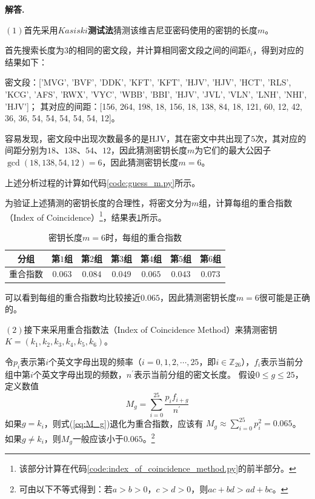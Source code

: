 \documentclass[12pt, a4paper, oneside]{ctexart}
\newenvironment{solution}{\par\noindent\textbf{解答. }}{\par}
\begin{document}
	\begin{solution}
		
		$ (1) $首先采用\textbf{$ Kasiski $测试法}猜测该维吉尼亚密码使用的密钥的长度$ m $。
		
		首先搜索长度为$ 3 $的相同的密文段，并计算相同密文段之间的间距$ \delta_{i} $，得到对应的结果如下：
		
		密文段：['MVG', 'BVF', 'DDK', 'KFT', 'KFT', 'HJV', 'HJV', 'HCT', 'RLS', 'KCG', 'AFS', 'RWX', 'VYC', 'WBB', 'BBI', 'HJV', 'JVL', 'VLN', 'LNH', 'NHI', 'HJV']；
		其对应的间距：[156, 264, 198, 18, 156, 18, 138, 84, 18, 121, 60, 12, 42, 36, 36, 54, 54, 54, 54, 54, 12]。
		
		容易发现，密文段中出现次数最多的是\textrm{HJV}，其在密文中共出现了$ 5 $次，其对应的间距分别为$ 18 $、$ 138 $、$ 54 $、$ 12 $，因此猜测密钥长度$ m $为它们的最大公因子$ \gcd{\left ( 18, 138, 54, 12 \right )} = 6 $，因此猜测密钥长度$ m = 6 $。
		
		上述分析过程的计算如代码\ref{code:guess_m.py}所示。
		
		
		
		
		为验证上述猜测的密钥长度的合理性，将密文分为$ m $组，计算每组的重合指数（Index of Coincidence）\footnote{该部分计算在代码\ref{code:index_of_coincidence_method.py}的前半部分。}，结果表\ref{tab:Index_of_coincidence}所示。
		
		\begin{table}[H]
			\caption{密钥长度$ m = 6 $时，每组的重合指数}
			\label{tab:Index_of_coincidence} \centering
			\begin{tabular}{|c|c|c|c|c|c|c|}
				\hline
				分组 & 第$ 1 $组 & 第$ 2 $组 & 第$ 3 $组 & 第$ 4 $组 & 第$ 5 $组 & 第$ 6 $组 \\ \hline
				重合指数 & $ 0.063 $ & $ 0.084 $ & $ 0.049 $ & $ 0.065 $ & $ 0.043 $ & $ 0.073 $ \\ \hline
			\end{tabular}
		\end{table}
	
		可以看到每组的重合指数均比较接近$ 0.065 $，因此猜测密钥长度$ m = 6 $很可能是正确的。
		
		
		$ (2) $接下来采用重合指数法（Index of Coincidence Method）来猜测密钥$ K = \left ( k_{1}, k_{2}, k_{3}, k_{4}, k_{5}, k_{6} \right ) $。
		
		令$ p_{i} $表示第$ i $个英文字母出现的频率（$ i = 0, 1, 2, \cdots , 25 $，即$ i \in \mathbb{Z}_{26} $），$ f_{i} $表示当前分组中第$ i $个英文字母出现的频数，$ n^{\prime} $表示当前分组的密文长度。
		假设$ 0 \leqslant g \leqslant 25 $，定义数值
		\begin{equation}
			\label{eq:M_g}
			M_{g}=\sum_{i=0}^{25} \frac{p_{i} f_{i+g}}{n^{\prime}}
		\end{equation}
		如果$ g=k_{i} $，则式(\ref{eq:M_g})退化为重合指数，应该有
		$ M_{g} \approx \sum_{i=0}^{25} p_{i}^{2} = 0.065 $。
		如果$ g \neq k_{i} $，则$ M_{g} $一般应该小于$ 0.065 $。\footnote{可由以下不等式得到：若$ a > b > 0 $，$ c > d > 0 $，则$ ac + bd > ad + bc $。}
		

\end{solution}
\end{document}
